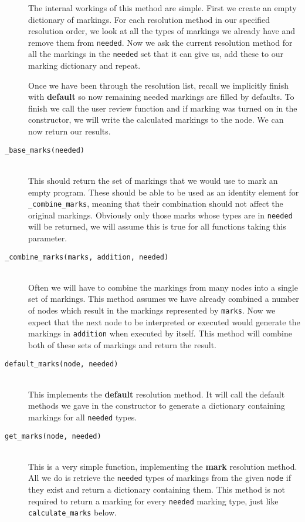 \documentclass[twoside,a4paper]{report}
\begin{document}
\begin{description}
The internal workings of this method are simple. First we create an empty dictionary of markings. For each resolution method in our specified resolution
order, we look at all the types of markings we already have and remove them from \texttt{needed}. Now we ask the current resolution method for all the
markings in the \texttt{needed} set that it can give us, add these to our marking dictionary and repeat.

Once we have been through the resolution list, recall we implicitly finish with \textbf{default} so now remaining needed markings are filled by defaults.
To finish we call the user review function and if marking was turned on in the constructor, we will write the calculated markings to the node. We can now
return our results.

\item[\texttt{\_base\_marks(needed)}] \hfill \\
This should return the set of markings that we would use to mark an empty program. These should be able to be used as an identity element for
\texttt{\_combine\_marks}, meaning that their combination should not affect the original markings. Obviously only those marks whose types are in
\texttt{needed} will be returned, we will assume this is true for all functions taking this parameter.

\item[\texttt{\_combine\_marks(marks, addition, needed)}] \hfill \\
Often we will have to combine the markings from many nodes into a single set of markings. This method assumes we have already combined a number of nodes
which result in the markings represented by \texttt{marks}. Now we expect that the next node to be interpreted or executed would generate the markings
in \texttt{addition} when executed by itself. This method will combine both of these sets of markings and return the result.

\item[\texttt{default\_marks(node, needed)}] \hfill \\
This implements the \textbf{default} resolution method. It will call the default methods we gave in the constructor to generate a dictionary containing
markings for all \texttt{needed} types.

\item[\texttt{get\_marks(node, needed)}] \hfill \\
This is a very simple function, implementing the \textbf{mark} resolution method. All we do is retrieve the \texttt{needed} types of markings from the
given \texttt{node} if they exist and return a dictionary containing them. This method is not required to return a marking for every \texttt{needed}
marking type, just like \texttt{calculate\_marks} below.


\end{description}
\end{document}
